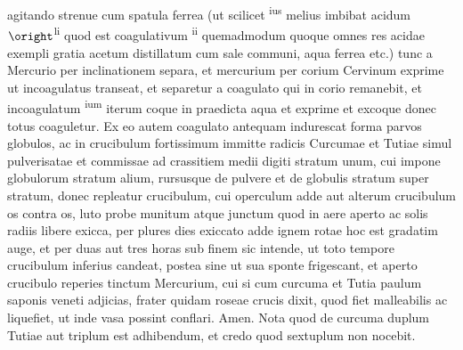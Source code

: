 agitando strenue cum spatula\protect{} ferrea (ut scilicet \mercury \textsuperscript{ius}\protect{} melius imbibat \protect{} acidum $\oright$\textsuperscript{li}\protect{} quod est coagulativum \mercury \textsuperscript{ii}\protect{} quemadmodum quoque omnes res acidae exempli gratia acetum\protect{} distillatum cum sale communi, aqua ferrea\protect{} etc.) tunc a Mercurio\protect{} per inclinationem separa, et mercurium\protect{} per corium Cervinum exprime ut incoagulatus transeat, et separetur a coagulato qui in corio remanebit, et incoagulatum \mercury \textsuperscript{ium}\protect{} iterum coque in praedicta aqua et exprime et excoque donec totus coaguletur. Ex eo autem coagulato antequam indurescat forma parvos globulos, ac in crucibulum fortissimum immitte radicis\protect{} Curcumae\protect{} et Tutiae\protect{} simul pulverisatae et commissae ad crassitiem medii digiti stratum unum, cui impone globulorum stratum alium, rursusque de pulvere et de globulis stratum super stratum, donec repleatur crucibulum, cui operculum adde aut alterum crucibulum os contra os, luto probe munitum atque junctum quod in aere aperto ac solis radiis libere exicca, per
plures dies exiccato adde ignem rotae\protect{} hoc est
gradatim auge, et per duas aut tres horas sub finem sic intende, ut toto tempore crucibulum inferius candeat, postea sine ut sua sponte frigescant, et aperto crucibulo reperies tinctum Mercurium\protect{}, cui si cum curcuma\protect{} et Tutia\protect{} paulum saponis veneti\protect{} adjicias, frater quidam roseae crucis dixit, quod fiet malleabilis ac liquefiet, ut inde vasa possint conflari. Amen. Nota quod de curcuma duplum Tutiae\protect{} aut triplum est adhibendum, et credo quod sextuplum non nocebit.
